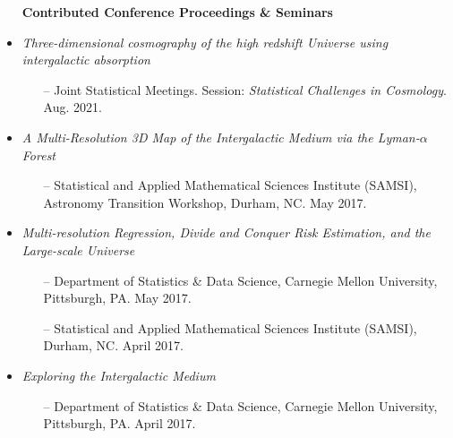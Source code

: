 \documentclass[letterpaper,10pt]{article}
\begin{document}
\begin{itemize}[itemsep=0.3cm, leftmargin=0.6cm]
\item[] \hspace{-5ex} {\bf Contributed Conference Proceedings \& Seminars} 
\vspace{-0.25cm}

\item {\it Three-dimensional cosmography of the high redshift Universe using intergalactic absorption}
\begin{itemize}[leftmargin=0.55cm, itemsep=0.1cm]
\item[--] Joint Statistical Meetings. Session: {\it Statistical Challenges in Cosmology}. Aug. 2021.
\end{itemize}

\item {\it A Multi-Resolution 3D Map of the Intergalactic Medium via the Lyman-$\alpha$ Forest}
\begin{itemize}[leftmargin=0.55cm, itemsep=0.1cm]
\item[--] Statistical and Applied Mathematical Sciences Institute (SAMSI), Astronomy Transition Workshop, Durham, NC. May 2017.
\end{itemize}

\item {\it Multi-resolution Regression, Divide and Conquer Risk Estimation, and the Large-scale Universe}
\begin{itemize}[leftmargin=0.55cm, itemsep=0.1cm]
\item[--] Department of Statistics \& Data Science, Carnegie Mellon University, Pittsburgh, PA. May 2017.
\item[--] Statistical and Applied Mathematical Sciences Institute (SAMSI), Durham, NC. April 2017.
\end{itemize}

\item {\it Exploring the Intergalactic Medium}
\begin{itemize}[leftmargin=0.55cm, itemsep=0.1cm]
\item[--] Department of Statistics \& Data Science, Carnegie Mellon University, Pittsburgh, PA. April 2017.
\end{itemize}
\end{itemize}
\end{document}
